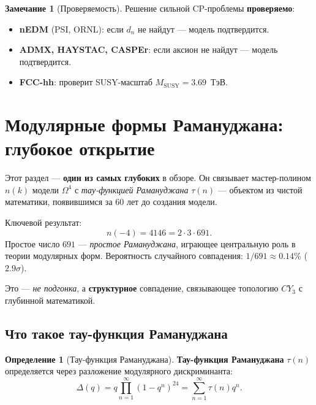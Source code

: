 \documentclass[11pt,a4paper]{article}
\newcommand{\CY}{CY_3}
\newcommand{\Om}{\Omega^4}
\theoremstyle{definition}
\newtheorem{definition}[theorem]{Определение}
\newtheorem{remark}[theorem]{Замечание}
\begin{document}
\begin{remark}[Проверяемость]
\label{rem:testability-cp-review}
Решение сильной CP-проблемы \textbf{проверяемо}:
\begin{itemize}
    \item \textbf{nEDM} (PSI, ORNL): если $d_n$ не найдут
          — модель подтвердится.
    \item \textbf{ADMX, HAYSTAC, CASPEr}: если аксион не найдут
          — модель подтвердится.
    \item \textbf{FCC-hh}: проверит SUSY-масштаб $M_{\text{SUSY}} = 3.69$~ТэВ.
\end{itemize}
\end{remark}
\section{Модулярные формы Рамануджана: глубокое открытие}
\label{sec:modular}

Этот раздел — \textbf{один из самых глубоких} в обзоре. Он 
связывает мастер-полином $n(k)$ модели $\Om$ с \emph{тау-функцией 
Рамануджана} $\tau(n)$ — объектом из чистой математики, 
появившимся за 60 лет до создания модели.

Ключевой результат:
\begin{equation}
    \boxed{
    n(-4) = 4146 = 2 \cdot 3 \cdot 691.
    }
    \label{eq:ramanujan-main}
\end{equation}
Простое число $691$ — \emph{простое Рамануджана}, играющее 
центральную роль в теории модулярных форм. Вероятность 
случайного совпадения: $1/691 \approx 0.14\%$ ($2.9\sigma$).

Это — \emph{не подгонка}, а \textbf{структурное} совпадение, 
связывающее топологию $\CY$ с глубинной математикой.

\subsection{Что такое тау-функция Рамануджана}
\label{subsec:tau-function}

\begin{definition}[Тау-функция Рамануджана]
\label{def:tau-function}
\textbf{Тау-функция Рамануджана} $\tau(n)$ определяется через 
разложение модулярного дискриминанта:
\begin{equation}
    \Delta(q) = q \prod_{n=1}^{\infty} (1 - q^n)^{24}
    = \sum_{n=1}^{\infty} \tau(n) q^n.
    \label{eq:tau-def}
\end{equation}
\end{definition}
\end{document}
